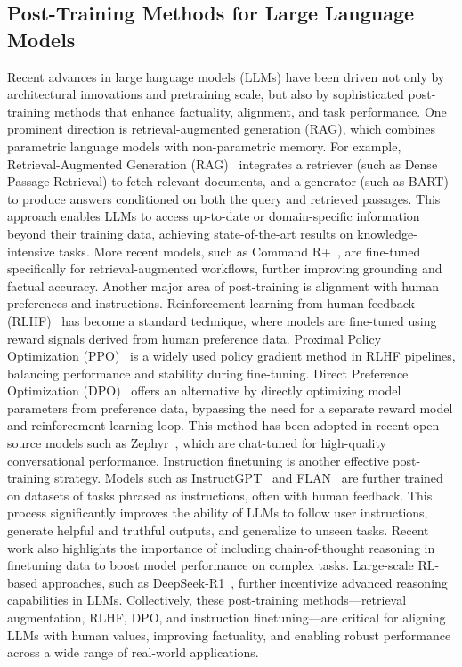 \subsection{Post-Training Methods for Large Language Models}
Recent advances in large language models (LLMs) have been driven not only by architectural innovations and pretraining scale, but also by sophisticated post-training methods that enhance factuality, alignment, and task performance. One prominent direction is retrieval-augmented generation (RAG), which combines parametric language models with non-parametric memory. For example, Retrieval-Augmented Generation (RAG)~\citep{lewis2020retrieval} integrates a retriever (such as Dense Passage Retrieval) to fetch relevant documents, and a generator (such as BART) to produce answers conditioned on both the query and retrieved passages. This approach enables LLMs to access up-to-date or domain-specific information beyond their training data, achieving state-of-the-art results on knowledge-intensive tasks. More recent models, such as Command R+~\citep{cohere2024commandrplus}, are fine-tuned specifically for retrieval-augmented workflows, further improving grounding and factual accuracy.
Another major area of post-training is alignment with human preferences and instructions. Reinforcement learning from human feedback (RLHF)~\citep{christiano2017deep, ouyang2022training} has become a standard technique, where models are fine-tuned using reward signals derived from human preference data. Proximal Policy Optimization (PPO)~\citep{schulman2017proximal} is a widely used policy gradient method in RLHF pipelines, balancing performance and stability during fine-tuning. Direct Preference Optimization (DPO)~\citep{rafailov2023direct} offers an alternative by directly optimizing model parameters from preference data, bypassing the need for a separate reward model and reinforcement learning loop. This method has been adopted in recent open-source models such as Zephyr~\citep{huggingface2023zephyr}, which are chat-tuned for high-quality conversational performance.
Instruction finetuning is another effective post-training strategy. Models such as InstructGPT~\citep{ouyang2022training} and FLAN~\citep{wei2021flan} are further trained on datasets of tasks phrased as instructions, often with human feedback. This process significantly improves the ability of LLMs to follow user instructions, generate helpful and truthful outputs, and generalize to unseen tasks. Recent work also highlights the importance of including chain-of-thought reasoning in finetuning data to boost model performance on complex tasks. Large-scale RL-based approaches, such as DeepSeek-R1~\citep{guo2025deepseekr1}, further incentivize advanced reasoning capabilities in LLMs.
Collectively, these post-training methods—retrieval augmentation, RLHF, DPO, and instruction finetuning—are critical for aligning LLMs with human values, improving factuality, and enabling robust performance across a wide range of real-world applications.


